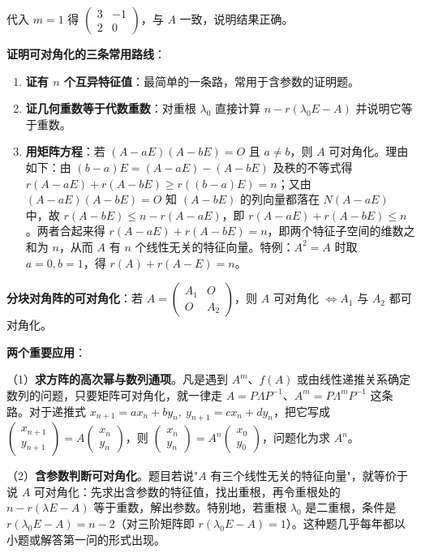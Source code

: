 \documentclass[11pt,openany,UTF8]{ctexbook}
\begin{document}
代入 $m=1$ 得 $\begin{pmatrix}3&-1\\2&0\end{pmatrix}$，与 $A$ 一致，说明结果正确。

\textbf{证明可对角化的三条常用路线}：

\begin{enumerate}
\item \textbf{证有 $n$ 个互异特征值}：最简单的一条路，常用于含参数的证明题。
\item \textbf{证几何重数等于代数重数}：对重根 $\lambda_0$ 直接计算 $n-r(\lambda_0E-A)$ 并说明它等于重数。
\item \textbf{用矩阵方程}：若 $(A-aE)(A-bE)=O$ 且 $a\neq b$，则 $A$ 可对角化。理由如下：由 $(b-a)E=(A-aE)-(A-bE)$ 及秩的不等式得 $r(A-aE)+r(A-bE)\geq r((b-a)E)=n$；又由 $(A-aE)(A-bE)=O$ 知 $(A-bE)$ 的列向量都落在 $N(A-aE)$ 中，故 $r(A-bE)\leq n-r(A-aE)$，即 $r(A-aE)+r(A-bE)\leq n$。两者合起来得 $r(A-aE)+r(A-bE)=n$，即两个特征子空间的维数之和为 $n$，从而 $A$ 有 $n$ 个线性无关的特征向量。特例：$A^2=A$ 时取 $a=0,b=1$，得 $r(A)+r(A-E)=n$。
\end{enumerate}
\textbf{分块对角阵的可对角化}：若 $A=\begin{pmatrix}A_1&O\\O&A_2\end{pmatrix}$，则 $A$ 可对角化 $\iff A_1$ 与 $A_2$ 都可对角化。

\textbf{两个重要应用}：

（1）\textbf{求方阵的高次幂与数列通项}。凡是遇到 $A^m$、$f(A)$ 或由线性递推关系确定数列的问题，只要矩阵可对角化，就一律走 $A=P\Lambda P^{-1}$、$A^m=P\Lambda^mP^{-1}$ 这条路。对于递推式 $x_{n+1}=ax_n+by_n,\ y_{n+1}=cx_n+dy_n$，把它写成 $\begin{pmatrix}x_{n+1}\\y_{n+1}\end{pmatrix}=A\begin{pmatrix}x_n\\y_n\end{pmatrix}$，则 $\begin{pmatrix}x_n\\y_n\end{pmatrix}=A^n\begin{pmatrix}x_0\\y_0\end{pmatrix}$，问题化为求 $A^n$。

（2）\textbf{含参数判断可对角化}。题目若说"$A$ 有三个线性无关的特征向量"，就等价于说 $A$ 可对角化：先求出含参数的特征值，找出重根，再令重根处的 $n-r(\lambda E-A)$ 等于重数，解出参数。特别地，若重根 $\lambda_0$ 是二重根，条件是 $r(\lambda_0E-A)=n-2$（对三阶矩阵即 $r(\lambda_0E-A)=1$）。这种题几乎每年都以小题或解答第一问的形式出现。
\end{document}
